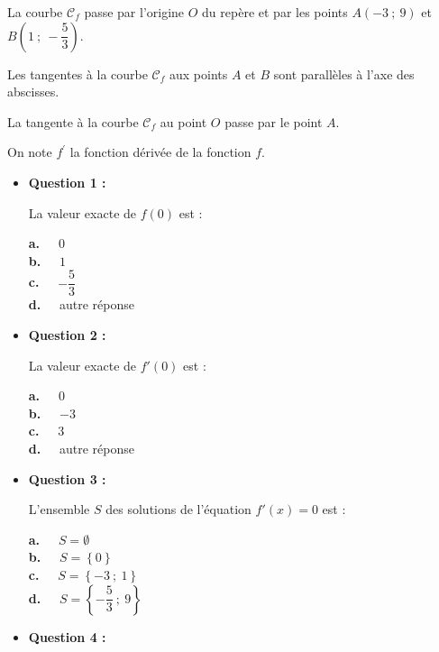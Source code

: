 \par
La courbe $\mathscr{C}_{f}$ passe par l'origine $O$ du repère et par les points $A(-3~;~9)$ et $B\left(1~;~-\dfrac{5}{3}\right)$.
\par
Les tangentes à la courbe $\mathscr{C}_{f}$ aux points $A$ et $B$ sont parallèles à l'axe des abscisses.
\par
La tangente à la courbe $\mathscr{C}_{f}$ au point $O$ passe par le point $A$.
\par
\medskip
\par
On note $f^{\prime}$  la fonction dérivée de la fonction $f$.
\par
\begin{itemize}
     \item \textbf{Question 1 :}
     \par
     La valeur exacte de $f(0)$ est :
     \par
     \textbf{a.~~} $0$ \\
     \textbf{b.~~} $1$ \\
     \textbf{c.~~} $-\dfrac{5}{3}$ \\
     \textbf{d.~~} autre réponse \\
     \par
     \item \textbf{Question 2 :}
     \par
     La valeur exacte de $f'(0)$ est :
     \par
     \textbf{a.~~} $0$ \\
     \textbf{b.~~} $-3$ \\
     \textbf{c.~~} $3$ \\
     \textbf{d.~~} autre réponse \\
     \par
     \item \textbf{Question 3 :}
     \par
     L'ensemble $S$ des solutions de l'équation $f'(x)=0$ est :
     \par
     \textbf{a.~~} $S=\emptyset$ \\
     \textbf{b.~~} $S=\left\{0\right\}$  \\
     \textbf{c.~~} $S=\left\{-3~;~1\right\}$ \\
     \textbf{d.~~} $S=\left\{-\dfrac{5}{3}~;~9\right\}$ \\
     \par
     \item \textbf{Question 4 :}

\end{itemize}
